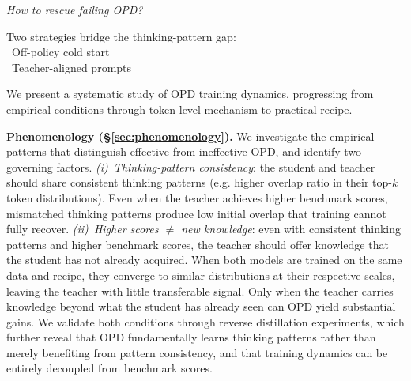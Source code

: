 \begin{tcolorbox}[
  enhanced,
  colback=white,
  colframe=black!25,          %
  boxrule=0.5pt,
  arc=2.5mm,                  %
  left=3mm, right=3mm,
  top=2.5mm, bottom=3mm,
]
\begin{minipage}[c]{0.285\linewidth}
\begin{tcolorbox}
\end{tcolorbox}
\end{minipage}%
\hfill
{\color{black!30}\raisebox{-2.5mm}{\large$\boldsymbol{\Rightarrow}$}}%
\hfill
\begin{minipage}[c]{0.285\linewidth}
\parbox[t][1em][c]{\linewidth}{%
  \centering\scriptsize\color{gray}%
  \textit{How to rescue failing OPD?}}
\begin{tcolorbox}[
  enhanced,
  colback=recipebg,
  colframe=recipeframe,
  fonttitle=\bfseries\footnotesize,
  title={\faFlask\hspace{0.2em}~~Recipe (\S\ref{sec:recipe})},
  coltitle=white,
  colbacktitle=recipeframe,
  toptitle=1.3mm, bottomtitle=1.3mm,
  boxrule=0.4pt,
  arc=1.5mm,
  top=1.5mm, bottom=1.5mm, left=1.5mm, right=1.5mm,
  fontupper=\scriptsize,
  equal height group=overviewpillar,
]
Two strategies bridge the thinking-pattern gap:\\[2pt]
{\scriptsize\color{black!70}%
\textbullet~Off-policy cold start\\
\textbullet~Teacher-aligned prompts}
\end{tcolorbox}
\end{minipage}
\end{tcolorbox}
\vspace{2pt}


We present a systematic study of OPD training dynamics, progressing from empirical conditions through token-level mechanism to practical recipe.

\textbf{Phenomenology (\S\ref{sec:phenomenology}).}
We investigate the empirical patterns that distinguish effective from ineffective OPD, and identify two governing factors.
\emph{(i)~Thinking-pattern consistency}: the student and teacher should share consistent thinking patterns (e.g. higher overlap ratio in their top-$k$ token distributions). Even when the teacher achieves higher benchmark scores, mismatched thinking patterns produce low initial overlap that training cannot fully recover.
\emph{(ii)~Higher scores $\neq$ new knowledge}: even with consistent thinking patterns and higher benchmark scores, the teacher should offer knowledge that the student has not already acquired.
When both models are trained on the same data and recipe, they converge to similar distributions at their respective scales, leaving the teacher with little transferable signal.
Only when the teacher carries knowledge beyond what the student has already seen can OPD yield substantial gains.
We validate both conditions through reverse distillation experiments, which further reveal that OPD fundamentally learns thinking patterns rather than merely benefiting from pattern consistency, and that training dynamics can be entirely decoupled from benchmark scores.

